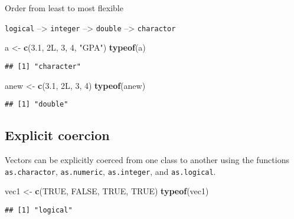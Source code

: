 \documentclass[]{book}
\newenvironment{Shaded}{\begin{snugshade}}{\end{snugshade}}
\newcommand{\DecValTok}[1]{\textcolor[rgb]{0.00,0.00,0.81}{#1}}
\newcommand{\FloatTok}[1]{\textcolor[rgb]{0.00,0.00,0.81}{#1}}
\newcommand{\KeywordTok}[1]{\textcolor[rgb]{0.13,0.29,0.53}{\textbf{#1}}}
\newcommand{\NormalTok}[1]{#1}
\newcommand{\OtherTok}[1]{\textcolor[rgb]{0.56,0.35,0.01}{#1}}
\newcommand{\StringTok}[1]{\textcolor[rgb]{0.31,0.60,0.02}{#1}}
\begin{document}
Order from least to most flexible

\texttt{logical} --\textgreater{} \texttt{integer} --\textgreater{} \texttt{double} --\textgreater{} \texttt{charactor}

\begin{Shaded}
\begin{Highlighting}[]
\NormalTok{a <-}\StringTok{ }\KeywordTok{c}\NormalTok{(}\FloatTok{3.1}\NormalTok{, 2L, }\DecValTok{3}\NormalTok{, }\DecValTok{4}\NormalTok{, }\StringTok{"GPA"}\NormalTok{) }
\KeywordTok{typeof}\NormalTok{(a) }
\end{Highlighting}
\end{Shaded}

\begin{verbatim}
## [1] "character"
\end{verbatim}

\begin{Shaded}
\begin{Highlighting}[]
\NormalTok{anew <-}\StringTok{ }\KeywordTok{c}\NormalTok{(}\FloatTok{3.1}\NormalTok{, 2L, }\DecValTok{3}\NormalTok{, }\DecValTok{4}\NormalTok{)}
\KeywordTok{typeof}\NormalTok{(anew) }
\end{Highlighting}
\end{Shaded}

\begin{verbatim}
## [1] "double"
\end{verbatim}

\hypertarget{explicit-coercion}{%
\subsection{Explicit coercion}\label{explicit-coercion}}

Vectors can be explicitly coerced from one class to another using the functions \texttt{as.charactor}, \texttt{as.numeric}, \texttt{as.integer}, and \texttt{as.logical}.

\begin{Shaded}
\begin{Highlighting}[]
\NormalTok{vec1 <-}\StringTok{ }\KeywordTok{c}\NormalTok{(}\OtherTok{TRUE}\NormalTok{, }\OtherTok{FALSE}\NormalTok{, }\OtherTok{TRUE}\NormalTok{, }\OtherTok{TRUE}\NormalTok{)}
\KeywordTok{typeof}\NormalTok{(vec1)}
\end{Highlighting}
\end{Shaded}

\begin{verbatim}
## [1] "logical"
\end{verbatim}
\end{document}
